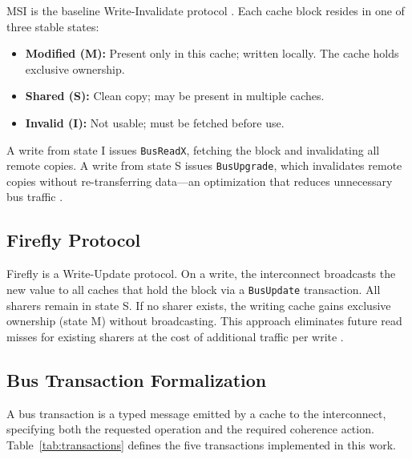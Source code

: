 \documentclass[journal,trans]{IEEEtran}
\begin{document}
MSI is the baseline Write-Invalidate protocol \cite{archibald1986cache}.
Each cache block resides in one of three stable states:
 
\begin{itemize}
  \item \textbf{Modified (M):} Present only in this cache; written locally.
        The cache holds exclusive ownership.
  \item \textbf{Shared (S):} Clean copy; may be present in multiple caches.
  \item \textbf{Invalid (I):} Not usable; must be fetched before use.
\end{itemize}
 
A write from state I issues \texttt{BusReadX}, fetching the block and
invalidating all remote copies. A write from state S issues \texttt{BusUpgrade},
which invalidates remote copies without re-transferring data---an optimization
that reduces unnecessary bus traffic \cite{hennessy2017computer}.
 
\subsection{Firefly Protocol}
 
Firefly \cite{thacker1988firefly} is a Write-Update protocol. On a write, the
interconnect broadcasts the new value to all caches that hold the block via a
\texttt{BusUpdate} transaction. All sharers remain in state S. If no sharer
exists, the writing cache gains exclusive ownership (state M) without
broadcasting. This approach eliminates future read misses for existing sharers
at the cost of additional traffic per write \cite{culler1999parallel}.
 
\subsection{Bus Transaction Formalization}
 
A bus transaction is a typed message emitted by a cache to the interconnect,
specifying both the requested operation and the required coherence action.
Table~\ref{tab:transactions} defines the five transactions implemented in this
work.
\end{document}
